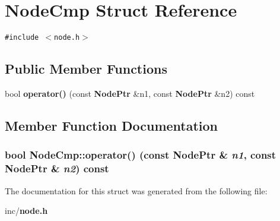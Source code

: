 \section{NodeCmp Struct Reference}
\label{structNodeCmp}
{\tt \#include $<$node.h$>$}

\subsection*{Public Member Functions}
\begin{CompactItemize}
\item 
bool {\bf operator()} (const {\bf NodePtr} \&n1, const {\bf NodePtr} \&n2) const
\end{CompactItemize}


\subsection{Member Function Documentation}
\subsubsection{\setlength{\rightskip}{0pt plus 5cm}bool NodeCmp::operator() (const {\bf NodePtr} \& {\em n1}, const {\bf NodePtr} \& {\em n2}) const\hspace{0.3cm}{\tt  [inline]}}\label{structNodeCmp_359d377be009f27e3c16464820045ee1}




The documentation for this struct was generated from the following file:\begin{CompactItemize}
\item 
inc/{\bf node.h}\end{CompactItemize}
